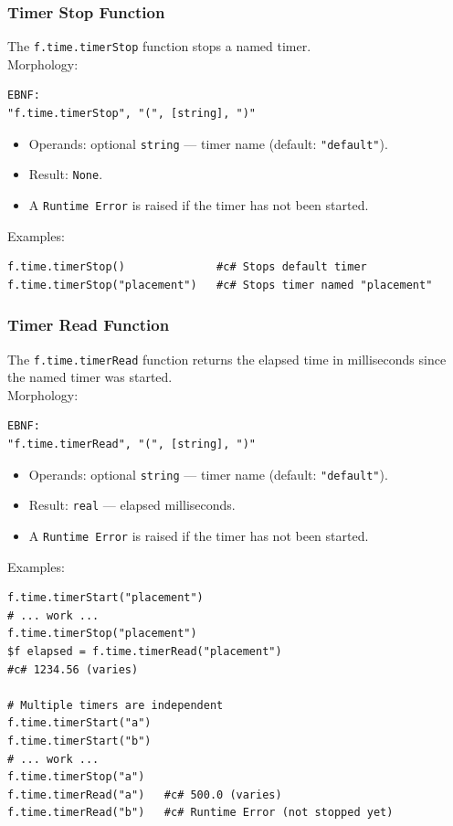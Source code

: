 \subsubsection{Timer Stop Function}
The \texttt{f.time.timerStop} function stops a named timer. \\
Morphology:
\begin{verbatim}
EBNF:
"f.time.timerStop", "(", [string], ")"
\end{verbatim}
\begin{itemize}
\item Operands: optional \texttt{string} --- timer name (default: \texttt{"default"}).
\item Result: \texttt{None}.
\item A \texttt{Runtime Error} is raised if the timer has not been started.
\end{itemize}
Examples:
\begin{verbatim}
f.time.timerStop()              #c# Stops default timer
f.time.timerStop("placement")   #c# Stops timer named "placement"
\end{verbatim}

\subsubsection{Timer Read Function}
The \texttt{f.time.timerRead} function returns the elapsed time in milliseconds since the named timer was started. \\
Morphology:
\begin{verbatim}
EBNF:
"f.time.timerRead", "(", [string], ")"
\end{verbatim}
\begin{itemize}
\item Operands: optional \texttt{string} --- timer name (default: \texttt{"default"}).
\item Result: \texttt{real} --- elapsed milliseconds.
\item A \texttt{Runtime Error} is raised if the timer has not been started.
\end{itemize}
Examples:
\begin{verbatim}
f.time.timerStart("placement")
# ... work ...
f.time.timerStop("placement")
$f elapsed = f.time.timerRead("placement")
#c# 1234.56 (varies)

# Multiple timers are independent
f.time.timerStart("a")
f.time.timerStart("b")
# ... work ...
f.time.timerStop("a")
f.time.timerRead("a")   #c# 500.0 (varies)
f.time.timerRead("b")   #c# Runtime Error (not stopped yet)
\end{verbatim}

